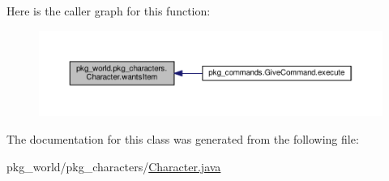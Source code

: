 Here is the caller graph for this function\-:
\nopagebreak
\begin{figure}[H]
\begin{center}
\leavevmode
\includegraphics[width=350pt]{classpkg__world_1_1pkg__characters_1_1Character_a816f8f79ef1e8c9635f0cdeb180b9f3f_icgraph}
\end{center}
\end{figure}




The documentation for this class was generated from the following file\-:\begin{DoxyCompactItemize}
\item 
pkg\-\_\-world/pkg\-\_\-characters/\hyperlink{Character_8java}{Character.\-java}\end{DoxyCompactItemize}
